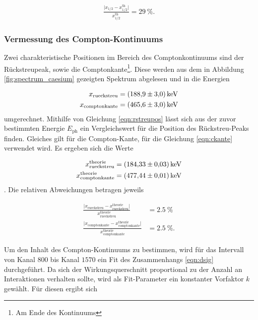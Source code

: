 \begin{align}
  \frac{\lvert x_{1/2} - x_{1/2}^{\text{th}} \rvert}{x_{1/2}^{\text{th}}} = \SI{29}{\percent}.
\end{align}

\subsubsection{Vermessung des Compton-Kontinuums}
\label{subsubsec:a22}
Zwei charakteristische Positionen im Bereich des Comptonkontinuums sind der Rückstreupeak, sowie die
Comptonkante\footnote{Am Ende des Kontinuums}. Diese werden aus dem in Abbildung \ref{fig:spectrum_caesium} gezeigten
Spektrum abgelesen und in die Energien

\begin{align*}
  x_\text{rueckstreu} &= \SI{188.9+-3.0}{\kilo\electronvolt}\\
  x_\text{comptonkante} &= \SI{465.6+-3.0}{\kilo\electronvolt}
\end{align*}
umgerechnet. Mithilfe von Gleichung \eqref{eqn:rstreupos} lässt sich aus der zuvor bestimmten Energie $E_\text{ph}$
ein Vergleichswert für die Position des Rückstreu-Peaks finden. Gleiches gilt für die Compton-Kante, für die Gleichung
\eqref{eqn:ckante} verwendet wird.
Es ergeben sich die Werte

\begin{align*}
  x_\text{rueckstreu}^\text{theorie} = \SI{184.33+-0.03}{\kilo\electronvolt}\\
  x_\text{comptonkante}^\text{theorie} = \SI{477.44+-0.01}{\kilo\electronvolt}
\end{align*}.
Die relativen Abweichungen betragen jeweils

\begin{align*}
  \frac{\lvert x_\text{rueckstreu} - x_\text{rueckstreu}^\text{theorie} \rvert}{x_\text{rueckstreu}^\text{theorie}} &= \SI{2.5}{\percent}\\
  \frac{\lvert x_\text{comptonkante} - x_\text{comptonkante}^\text{theorie} \rvert}{x_\text{comptonkante}^\text{theorie}} &= \SI{2.5}{\percent}.
\end{align*}

Um den Inhalt des Compton-Kontinuums zu bestimmen, wird für das Intervall von Kanal $800$ bis Kanal $1570$ ein
Fit des Zusammenhangs \eqref{eqn:dsig} durchgeführt. Da sich der Wirkungsquerschnitt proportional zu
der Anzahl an Interaktionen verhalten sollte, wird als Fit-Parameter ein konstanter Vorfaktor $k$ gewählt. Für diesen ergibt
sich

